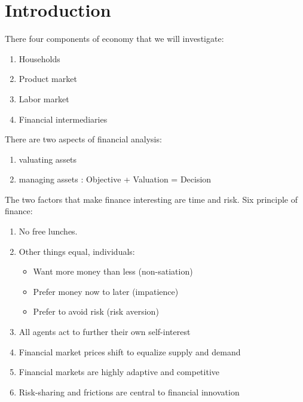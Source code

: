 \chapter{Introduction}
There four components of economy that we will investigate:
\begin{enumerate}
    \item Households
    \item Product market
    \item Labor market
    \item Financial intermediaries
\end{enumerate}

There are two aspects of financial analysis:
\begin{enumerate}
    \item valuating assets
    \item managing assets : Objective + Valuation = Decision
\end{enumerate}

The two factors that make finance interesting are time and risk.
Six principle of finance:
\begin{enumerate}
    \item No free lunches.
    \item Other things equal, individuals:
          \begin{itemize}
              \item Want more money than less (non-satiation)
              \item Prefer money now to later (impatience)
              \item Prefer to avoid risk (risk aversion)
          \end{itemize}
    \item All agents act to further their own self-interest
    \item Financial market prices shift to equalize supply and demand
    \item Financial markets are highly adaptive and competitive
    \item Risk-sharing and frictions are central to financial innovation
\end{enumerate}
